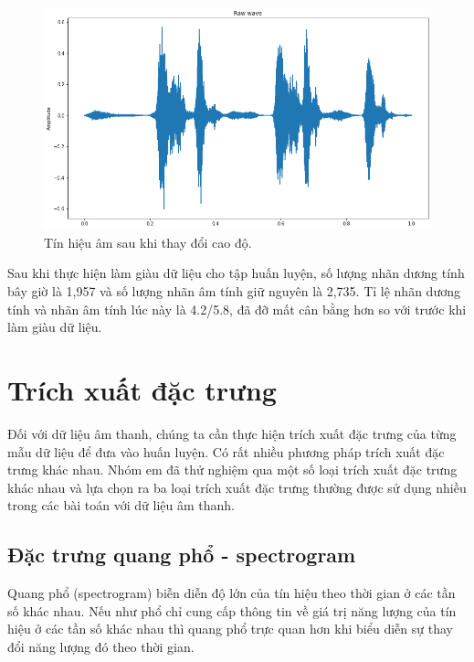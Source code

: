 \documentclass[a4paper, 12pt]{article}
\begin{document}
\begin{figure}[!h]
\captionsetup{width=0.8\textwidth}
\centering
\includegraphics[width=12.5cm]{images/3.4.png}
\caption{Tín hiệu âm sau khi thay đổi cao độ.}
\end{figure}

Sau khi thực hiện làm giàu dữ liệu cho tập huấn luyện, số lượng nhãn dương tính bây giờ là 1,957 và số lượng nhãn âm tính giữ nguyên là 2,735. Tỉ lệ nhãn dương tính và nhãn âm tính lúc này là 4.2/5.8, đã đỡ mất cân bằng hơn so với trước khi làm giàu dữ liệu.

\section{Trích xuất đặc trưng}
\noindent
Đối với dữ liệu âm thanh, chúng ta cần thực hiện trích xuất đặc trưng của từng mẫu dữ liệu để đưa vào huấn luyện. Có rất nhiều phương pháp trích xuất đặc trưng khác nhau. Nhóm em đã thử nghiệm qua một số loại trích xuất đặc trưng khác nhau và lựa chọn ra ba loại trích xuất đặc trưng thường được sử dụng nhiều trong các bài toán với dữ liệu âm thanh.

\subsection{Đặc trưng quang phổ - spectrogram}
Quang phổ (spectrogram) biễn diễn độ lớn của tín hiệu theo thời gian ở các tần số khác nhau. Nếu như phổ chỉ cung cấp thông tin về giá trị năng lượng của tín hiệu ở các tần số khác nhau thì quang phổ trực quan hơn khi biểu diễn sự thay đổi năng lượng đó theo thời gian.
\end{document}
